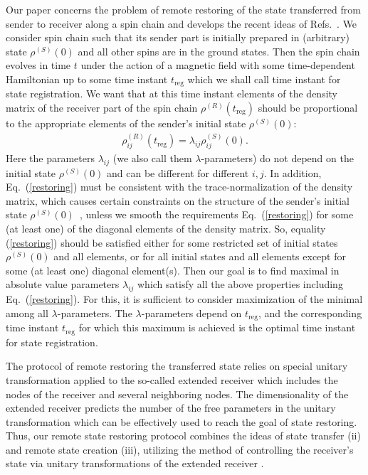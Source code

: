 \documentclass[pra,preprint,showpacs]{revtex4-1}
\begin{document}
{
Our paper  concerns the problem of
 remote
restoring of the
state transferred from} sender to receiver along a spin chain {and develops the recent ideas of  Refs.~\cite{FZ_2017,BFZ_Arch2018,Z_2018,FPZ_2021,BFLP_2022}.}
{We consider spin chain such that its sender part is
initially prepared in (arbitrary) state $\rho^{(S)}(0)$ and all other spins are
in the ground states. Then the spin chain evolves { in time $t$} under the action of a
magnetic field with some time-dependent Hamiltonian up to some time instant
$t_{\mathrm{reg}}$ which we shall call time instant for state registration.
We want that at this time instant elements of the density matrix of the receiver
part of the spin chain $\rho^{(R)}(t_{\mathrm{reg}})$ should be proportional
to the appropriate elements of the sender's initial state $\rho^{(S)}(0)$:}
\begin{eqnarray}\label{restoring}
\rho^{(R)}_{ij}(t_{\mathrm{reg}})=\lambda_{ij}\rho^{(S)}_{ij}(0).
\end{eqnarray}
{ Here the parameters $\lambda_{ij}$  (we also call them
$\lambda$-parameters) do not depend on the initial state $\rho^{(S)}(0)$
and can be different for different $i,j$. In addition,
Eq.~(\ref{restoring}) must be consistent with the trace-normalization of
the density matrix, which causes certain constraints on the structure of
the sender's initial state $\rho^{(S)}(0)$~\cite{FPZ_2021,BFLP_2022},
unless we smooth the requirements Eq.~(\ref{restoring}) for some (at
least one) of the diagonal elements of the density matrix. So, equality~
(\ref{restoring}) should be satisfied either for some restricted set of
initial states $\rho^{(S)}(0)$ and all elements, or for all initial
states and all elements except for some (at least one) diagonal element(s). Then our goal is to find maximal in absolute value parameters $\lambda_{ij}$ which satisfy all the above properties including Eq.~(\ref{restoring}). For this, it is sufficient to consider maximization of the minimal among all $\lambda$-parameters. The $\lambda$-parameters depend on $t_{\mathrm{reg}}$, and the corresponding time instant $t_{\mathrm{reg}}$ for which this maximum is achieved is the optimal time instant for state registration.}

{The protocol of remote restoring the transferred state}  relies on special unitary transformation applied to the so-called extended receiver which includes the nodes of the receiver and several neighboring nodes. The dimensionality of the extended receiver predicts the number of the free parameters in the unitary transformation which can be effectively used to reach the goal of state restoring.
{ Thus, our remote state restoring protocol combines the ideas of state transfer (ii) and remote state creation (iii), utilizing the method of controlling the receiver's state via unitary transformations of the extended receiver \cite{Z_2014,BZ_2015}.}
\end{document}
